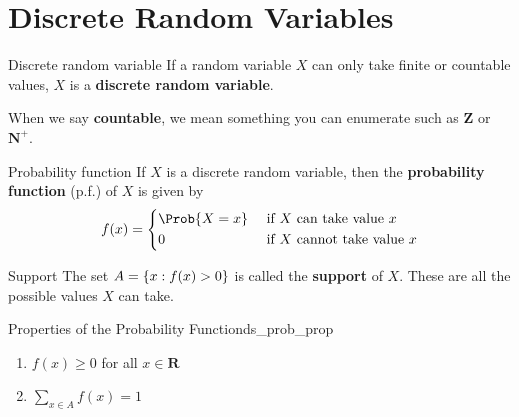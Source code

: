 \section{Discrete Random Variables}
\begin{Definition}{Discrete random variable}{}
    If a random variable $ X $ can only take
    finite or countable values, $ X $
    is a \textbf{discrete random variable}.
\end{Definition}
\begin{Remark}{}{}
    When we say \textbf{countable}, we mean
    something you can enumerate such as $ \mathbf{Z} $ or
    $ \mathbf{N}^+ $.
\end{Remark}

\begin{Definition}{Probability function}{}
    If $ X $ is a discrete random variable,
    then the \textbf{probability function} (p.f.) of $ X $ is given by
    \[ f(x)=
        \begin{dcases}
            \Prob{X=x} & \text{ if } X\text{ can take value }x    \\
            0          & \text{ if } X\text{ cannot take value }x
        \end{dcases} \]
\end{Definition}

\begin{Definition}{Support}{}
    The set $ A=\{x:f(x)>0\} $ is called the \textbf{support}
    of $ X $. These are all the possible values $ X $ can take.
\end{Definition}

\begin{Proposition}{Properties of the Probability Function}{ds_prob_prop}
    \begin{enumerate}[label=(\arabic*)]
        \item $ f(x)\ge 0 $ for all $ x\in\mathbf{R} $
        \item $ \sum\limits_{x\in A}f(x)=1 $
    \end{enumerate}
\end{Proposition}

